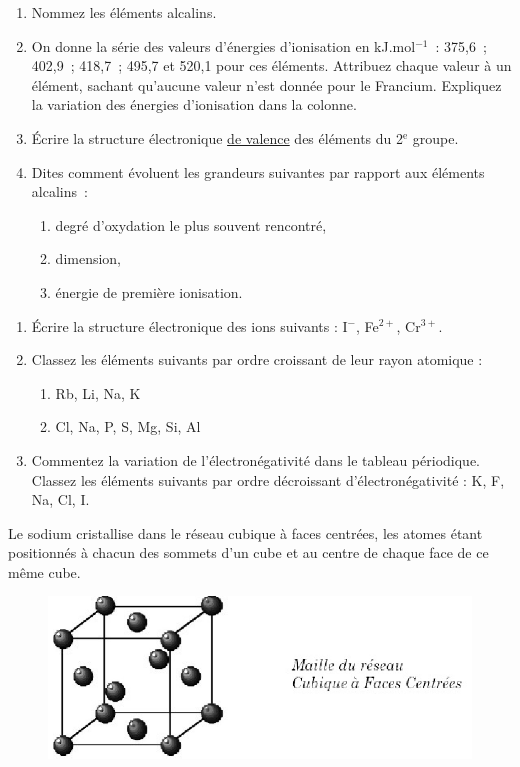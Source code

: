 \begin{enumerate}[\bf 1)]
\item Nommez les \'el\'ements alcalins.
\item On donne la s\'erie des valeurs d'\'energies d'ionisation en kJ.mol$^{-1}$~: 375,6~; 402,9~; 418,7~; 495,7 et 520,1 pour ces \'el\'ements. Attribuez chaque valeur \`a un \'el\'ement, sachant qu'aucune valeur n'est donn\'ee pour le Francium. Expliquez la variation des \'energies d'ionisation dans la colonne.
\item \'Ecrire la structure \'electronique \underline{de valence} des \'el\'ements du 2$^\textrm{e}$ groupe.
\item Dites comment \'evoluent les grandeurs suivantes par rapport aux \'el\'ements alcalins~:
\begin{enumerate}%
\item degr\'e d'oxydation le plus souvent rencontr\'e,
\item dimension,
\item \'energie de premi\`ere ionisation.
\end{enumerate}
\end{enumerate}
\begin{enumerate}[\bf 1)]
\item \'Ecrire la structure \'electronique des ions suivants : I$^-$, Fe$^{2+}$, Cr$^{3+}$.
\item Classez les \'el\'ements suivants par ordre croissant de leur rayon atomique :
\begin{enumerate}%
\item Rb, Li, Na, K
\item Cl, Na, P, S, Mg, Si, Al
\end{enumerate}
\item Commentez la variation de l'\'electron\'egativit\'e dans le tableau p\'eriodique. Classez les \'el\'ements suivants par ordre d\'ecroissant d'\'electron\'egativit\'e : K, F, Na, Cl, I.
\end{enumerate}
%
Le sodium cristallise dans le r\'eseau cubique \`a faces centr\'ees, les atomes \'etant positionn\'es \`a chacun des sommets d'un cube et au centre de chaque face de ce m\^eme cube.
\begin{figure}[!h]
\begin{center}
\includegraphics[scale=0.8]{figure/mailleCFC.eps}
\end{center}
\end{figure}
